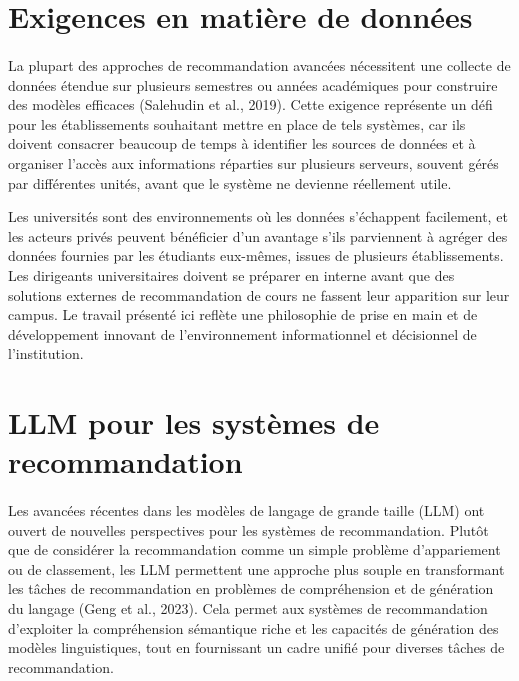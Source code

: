 \section{Exigences en matière de données}
\paragraph{} 
La plupart des approches de recommandation avancées nécessitent une collecte de données étendue sur plusieurs semestres ou années académiques pour construire des modèles efficaces (Salehudin et al., 2019). Cette exigence représente un défi pour les établissements souhaitant mettre en place de tels systèmes, car ils doivent consacrer beaucoup de temps à identifier les sources de données et à organiser l’accès aux informations réparties sur plusieurs serveurs, souvent gérés par différentes unités, avant que le système ne devienne réellement utile.

Les universités sont des environnements où les données s’échappent facilement, et les acteurs privés peuvent bénéficier d’un avantage s’ils parviennent à agréger des données fournies par les étudiants eux-mêmes, issues de plusieurs établissements. Les dirigeants universitaires doivent se préparer en interne avant que des solutions externes de recommandation de cours ne fassent leur apparition sur leur campus. Le travail présenté ici reflète une philosophie de prise en main et de développement innovant de l’environnement informationnel et décisionnel de l’institution.


\section{LLM pour les systèmes de recommandation}
\paragraph{} 
Les avancées récentes dans les modèles de langage de grande taille (LLM) ont ouvert de nouvelles perspectives pour les systèmes de recommandation. Plutôt que de considérer la recommandation comme un simple problème d’appariement ou de classement, les LLM permettent une approche plus souple en transformant les tâches de recommandation en problèmes de compréhension et de génération du langage (Geng et al., 2023). Cela permet aux systèmes de recommandation d’exploiter la compréhension sémantique riche et les capacités de génération des modèles linguistiques, tout en fournissant un cadre unifié pour diverses tâches de recommandation.

